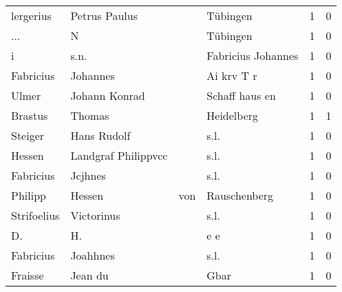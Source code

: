 \begin{center}
\begin{tiny}
\begin{longtabu}{llllrr}
                lergerius &                      Petrus Paulus &             &                                    Tübingen &          1 &         0 \\
                      ... &                                  N &             &                                    Tübingen &          1 &         0 \\
                        i &                               s.n. &             &                          Fabricius Johannes &          1 &         0 \\
                Fabricius &                           Johannes &             &                                  Ai krv T r &          1 &         0 \\
                    Ulmer &                      Johann Konrad &             &                              Schaff haus en &          1 &         0 \\
                  Brastus &                             Thomas &             &                                  Heidelberg &          1 &         1 \\
                  Steiger &                        Hans Rudolf &             &                                        s.l. &          1 &         0 \\
                   Hessen &                Landgraf Philippvcc &             &                                        s.l. &          1 &         0 \\
                Fabricius &                            Jcjhnes &             &                                        s.l. &          1 &         0 \\
                  Philipp &                             Hessen &         von &                                Rauschenberg &          1 &         0 \\
              Strifoelius &                         Victorinus &             &                                        s.l. &          1 &         0 \\
                       D. &                                 H. &             &                                         e e &          1 &         0 \\
                Fabricius &                           Joahhnes &             &                                        s.l. &          1 &         0 \\
                  Fraisse &                            Jean du &             &                                        Gbar &          1 &         0 \\

\end{longtabu}
\end{tiny}
\end{center}
